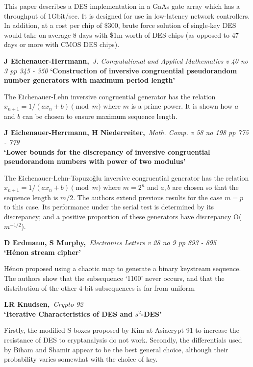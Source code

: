 This paper describes a DES implementation in a GaAs gate array which has a
throughput of 1Gbit/sec. It is designed for use in low-latency network
controllers. In addition, at a cost per chip of \$300, brute force solution
of single-key DES would take on average 8 days with \$1m worth of DES chips
(as opposed to 47 days or more with CMOS DES chips).

{\bf \noindent J Eichenauer-Herrmann,}{\em ~J. Computational and Applied
Mathematics v 40 no 3 pp 345 - 350}
{\bf `Construction of inversive congruential pseudorandom number generators
with maximum period length'}

The Eichenauer-Lehn inversive congruential generator has the relation 
$x_{n+1} = 1/(ax_n+b) \pmod{m}$ where $m$ is a prime power. It is shown how
$a$ and $b$ can be chosen to ensure maximum sequence length.

\pagebreak

{\bf \noindent J Eichenauer-Herrmann, H Niederreiter,}{\em ~Math. Comp. v 58
no 198 pp 775 - 779\\}
{\bf `Lower bounds for the discrepancy of inversive congruential pseudorandom
numbers with power of two modulus'}

The Eichenauer-Lehn-Topuzo\v{g}lu inversive congruential generator has the 
relation $x_{n+1} = 1/(ax_n+b) \pmod{m}$ where $m = 2^n$ and $a, b$ are chosen
so that the sequence length is $m/2$. The authors extend previous results for 
the case $m = p$ to this case. Its performance under the serial test is 
determined by its discrepancy; and a positive proportion of these generators
have discrepancy O($m^{-1/2}$).

{\bf \noindent D Erdmann, S Murphy,}{\em ~Electronics Letters v 28 no 9 pp 
893 - 895\\}
{\bf `H\'{e}non stream cipher'}

H\'enon proposed using a chaotic map to generate a binary keystream sequence.
The authors show that the subsequence `1100' never occurs, and that the
distribution of the other 4-bit subsequences is far from uniform.

{\bf \noindent LR Knudsen,}{\em ~Crypto 92\\}
{\bf `Iterative Characteristics of DES and $s^2$-DES'}

Firstly, the modified S-boxes proposed by Kim at Asiacrypt 91 to increase the 
resistance of DES to cryptanalysis do not work. Secondly, the differentials 
used by Biham and Shamir appear to be the best general choice, although 
their probability varies somewhat with the choice of key.

